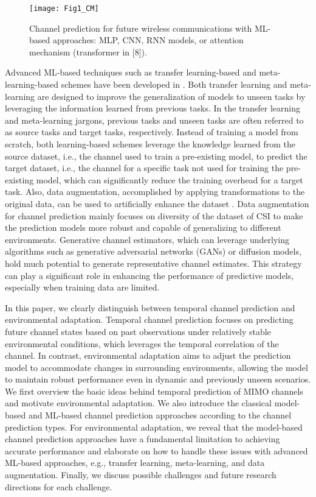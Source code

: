 \documentclass[lettersize,journal]{IEEEtran}
\begin{document}
\begin{figure*}[!t]
	\centering
	\texttt{[image: Fig1\_CM]}
	\caption{Channel prediction for future wireless communications with ML-based approaches: MLP, CNN, RNN models, or attention mechanism (transformer in [8]).}
	\label{fig_1}
\end{figure*}

Advanced ML-based techniques such as transfer learning-based and meta-learning-based schemes have been developed in \cite{Yuan21, Kim23}. Both transfer learning and meta-learning are designed to improve the generalization of models to unseen tasks by leveraging the information learned from previous tasks.
In the transfer learning and meta-learning jargons, previous tasks and unseen tasks are often referred to as source tasks and target tasks, respectively.
Instead of training a model from scratch, both learning-based schemes leverage the knowledge learned from the source dataset, i.e., the channel used to train a pre-existing model, to predict the target dataset, i.e., the channel for a specific task not used for training the pre-existing model, which can significantly reduce the training overhead for a target task.
Also, data augmentation, accomplished by applying transformations to the original data, can be used to artificially enhance the dataset \cite{Raviv23}. Data augmentation for channel prediction mainly focuses on diversity of the dataset of CSI to make the prediction models more robust and capable of generalizing to different environments. Generative channel estimators, which can leverage underlying algorithms such as generative adversarial networks (GANs) or diffusion models, hold much potential to generate representative channel estimates. This strategy can play a significant role in enhancing the performance of predictive models, especially when training data are limited.

In this paper, we clearly distinguish between temporal channel prediction and environmental adaptation. Temporal channel prediction focuses on predicting future channel states based on past observations under relatively stable environmental conditions, which leverages the temporal correlation of the channel. In contrast, environmental adaptation aims to adjust the prediction model to accommodate changes in surrounding environments, allowing the model to maintain robust performance even in dynamic and previously unseen scenarios. We first overview the basic ideas behind temporal prediction of MIMO channels and motivate environmental adaptation. We also introduce the classical model-based and ML-based channel prediction approaches according to the channel prediction types. For environmental adaptation, we reveal that the model-based channel prediction approaches have a fundamental limitation to achieving accurate performance and elaborate on how to handle these issues with advanced ML-based approaches, e.g., transfer learning, meta-learning, and data augmentation. Finally, we discuss possible challenges and future research directions for each challenge.
\end{document}
